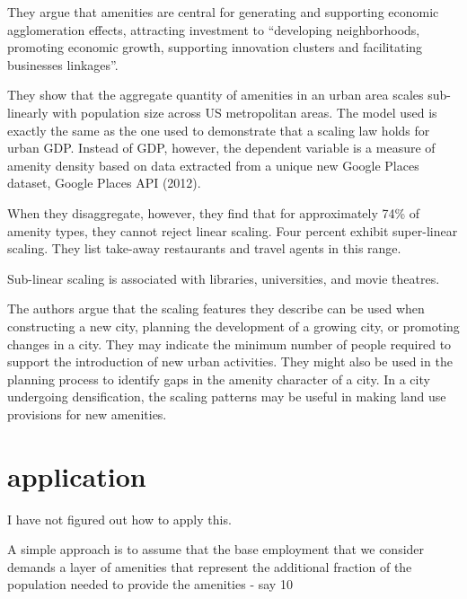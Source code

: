 They argue that amenities are  central for generating and supporting economic agglomeration effects, attracting investment to ``developing neighborhoods, promoting economic growth, supporting innovation clusters and facilitating businesses linkages''. 

They show that the aggregate quantity of amenities in an urban area  scales sub-linearly  with population size across US metropolitan areas. The model used is exactly the same as the one used to demonstrate that a scaling law holds for  urban GDP. Instead of GDP, however, the dependent variable is a measure of amenity density based on data extracted from a unique new Google Places dataset, Google Places API (2012).

When they disaggregate, however, they find that for approximately 74\% of amenity types, they cannot reject linear scaling. Four percent exhibit super-linear scaling. They list take-away restaurants and travel agents in this range. 

Sub-linear scaling is associated with libraries, universities, and movie theatres.

The authors argue that the scaling features they describe can be used when constructing a new city, planning the development of a growing city, or promoting changes in a city. They may indicate the minimum number of people required to support the introduction of new urban activities. They might also be used in the planning process to identify gaps in the amenity character of a city. In a city undergoing densification, the scaling patterns may be useful in  making land use provisions for new amenities.

\section{application}
I have not figured out how to apply this. 

A simple approach is to assume that the base employment that we consider demands a layer of amenities that represent the additional fraction of  the population needed to provide the amenities - say 10%
